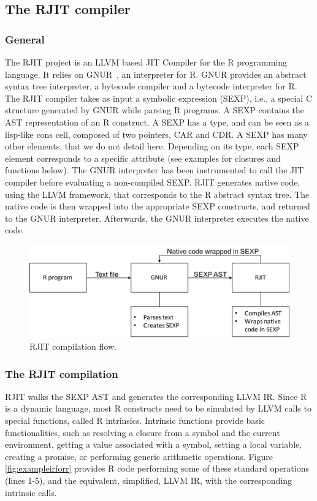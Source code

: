 \subsection{The RJIT compiler}
\subsubsection{General}

The RJIT project is an LLVM based JIT Compiler for the R programming language.
It relies on GNUR~\cite{RURL}, an interpreter for R. 
GNUR provides an abstract syntax tree interpreter, a bytecode compiler and a bytecode interpreter for R.
The RJIT compiler takes as input a symbolic expression (SEXP), i.e., a special C structure generated by GNUR while parsing R programs.
A SEXP contains the AST representation of an R construct.
A SEXP has a type, and can be seen as a lisp-like cons cell, composed of two pointers, CAR and CDR.
A SEXP has many other elements, that we do not detail here.
Depending on its type, each SEXP element corresponds to a specific attribute (see examples for closures and functions below). 
The GNUR interpreter has been instrumented to call the JIT compiler before evaluating a non-compiled SEXP. 
RJIT generates native code, using the LLVM framework, that corresponds to the R abstract syntax tree.
The native code is then wrapped into the appropriate SEXP constructs, and returned to the GNUR interpreter.
Afterwards, the GNUR interpreter executes the native code.\\ 

\begin{figure}[h]
    \includegraphics[scale=0.5]{Figures/RJITFlow}
    \caption{RJIT compilation flow.}
\end{figure}

\subsubsection{The RJIT compilation}
RJIT walks the SEXP AST and generates the corresponding LLVM IR.
Since R is a dynamic language, most R constructs need to be simulated by LLVM calls to special functions, called R intrinsics.
Intrinsic functions provide basic functionalities, such as resolving a closure from a symbol and the current environment, getting a value associated with a symbol, setting a local variable, creating a promise, or performing generic arithmetic operations.
Figure \ref{fig:exampleirforr} provides R code performing some of these standard operations (lines 1-5), and the equivalent, simplified, LLVM IR, with the corresponding intrinsic calls.\\

